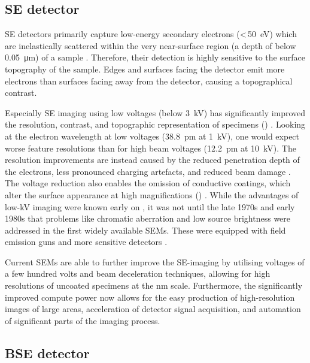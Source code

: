 \subsection[Secondary electron imaging]{\Acl*{SE} detector}
\label{sec:se}

\ac{SE} detectors primarily capture low-energy secondary electrons (<\,\qty{50}{\electronvolt}) which are inelastically scattered within the very near-surface region (a depth of below \qty{0.05}{\micro\meter}) of a sample \cite{pawley.1984}. %
Therefore, their detection is highly sensitive to the surface topography of the sample.
Edges and surfaces facing the detector emit more electrons than surfaces facing away from the detector, causing a topographical contrast.

Especially \ac{SE} imaging using low voltages (below \qty{3}{\kilo\volt}) has significantly improved the resolution, contrast, and topographic representation of specimens () \cite{pawley.1984,moser.1998}.
Looking at the electron wavelength at low voltages (\qty{38.8}{\pico\meter} at \qty{1}{\kilo\volt}), one would expect worse feature resolutions than for high beam voltages (\qty{12.2}{\pico\meter} at \qty{10}{\kilo\volt}).
The resolution improvements are instead caused by the reduced penetration depth of the electrons, less pronounced charging artefacts, and reduced beam damage \cite{pawley.1984}.
The voltage reduction also enables the omission of conductive coatings, which alter the surface appearance at high magnifications () \cite{pawley.1984,moser.1996}.
While the advantages of low-\unit{\kilo\volt} imaging were known early on \cite{vonardenne.1940}, it was not until the late 1970s and early 1980s that problems like chromatic aberration and low source brightness were addressed in the first widely available \ac{SEM}s.
These were equipped with field emission guns and more sensitive detectors \cite{pawley.1984,moser.1996}.

Current \ac{SEM}s are able to further improve the \ac{SE}-imaging by utilising voltages of a few hundred volts and beam deceleration techniques, allowing for high resolutions of uncoated specimens at the \unit{\nano\meter} scale.
Furthermore, the significantly improved compute power now allows for the easy production of high-resolution images of large areas, acceleration of detector signal acquisition, and automation of significant parts of the imaging process.

\subsection[BSE detector]{\Acl*{BSE} detector}
\label{sec:bse}

